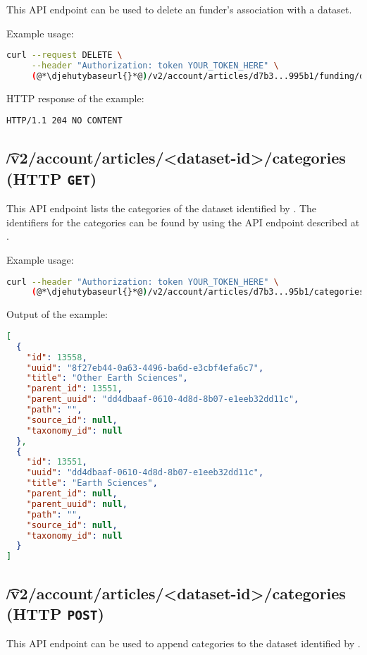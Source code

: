   This API endpoint can be used to delete an funder's association with a dataset.

  Example usage:
\begin{lstlisting}[language=bash]
curl --request DELETE \
     --header "Authorization: token YOUR_TOKEN_HERE" \
     (@*\djehutybaseurl{}*@)/v2/account/articles/d7b3...995b1/funding/d50e...7500
\end{lstlisting}

  HTTP response of the example:
\begin{lstlisting}
HTTP/1.1 204 NO CONTENT
\end{lstlisting}

\subsection{\t{/v2/account/articles/<dataset-id>/categories} (HTTP \texttt{GET})}

  This API endpoint lists the categories of the dataset identified by .
  The identifiers for the categories can be found by using the API endpoint
  described at \refer{sec:v2-categories}.

  Example usage:
\begin{lstlisting}[language=bash]
curl --header "Authorization: token YOUR_TOKEN_HERE" \
     (@*\djehutybaseurl{}*@)/v2/account/articles/d7b3...95b1/categories | jq
\end{lstlisting}

  Output of the example:
\begin{lstlisting}[language=JSON]
[
  {
    "id": 13558,
    "uuid": "8f27eb44-0a63-4496-ba6d-e3cbf4efa6c7",
    "title": "Other Earth Sciences",
    "parent_id": 13551,
    "parent_uuid": "dd4dbaaf-0610-4d8d-8b07-e1eeb32dd11c",
    "path": "",
    "source_id": null,
    "taxonomy_id": null
  },
  {
    "id": 13551,
    "uuid": "dd4dbaaf-0610-4d8d-8b07-e1eeb32dd11c",
    "title": "Earth Sciences",
    "parent_id": null,
    "parent_uuid": null,
    "path": "",
    "source_id": null,
    "taxonomy_id": null
  }
]
\end{lstlisting}

\subsection{\t{/v2/account/articles/<dataset-id>/categories} (HTTP \texttt{POST})}
\label{sec:api-v2-articles-categories-post}

  This API endpoint can be used to append categories to the dataset identified
  by \code{dataset-id}.

